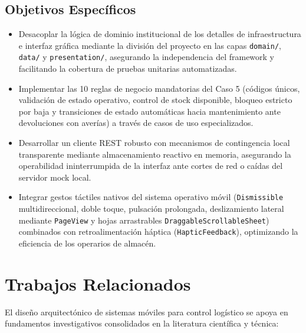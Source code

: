 \documentclass[12pt,a4paper]{article}
\begin{document}
\subsection{Objetivos Específicos}
\begin{itemize}
    \item Desacoplar la lógica de dominio institucional de los detalles de infraestructura e interfaz gráfica mediante la división del proyecto en las capas \texttt{domain/}, \texttt{data/} y \texttt{presentation/}, asegurando la independencia del framework y facilitando la cobertura de pruebas unitarias automatizadas.
    \item Implementar las 10 reglas de negocio mandatorias del Caso 5 (códigos únicos, validación de estado operativo, control de stock disponible, bloqueo estricto por baja y transiciones de estado automáticas hacia mantenimiento ante devoluciones con averías) a través de casos de uso especializados.
    \item Desarrollar un cliente REST robusto con mecanismos de contingencia local transparente mediante almacenamiento reactivo en memoria, asegurando la operabilidad ininterrumpida de la interfaz ante cortes de red o caídas del servidor mock local.
    \item Integrar gestos táctiles nativos del sistema operativo móvil (\texttt{Dismissible} multidireccional, doble toque, pulsación prolongada, deslizamiento lateral mediante \texttt{PageView} y hojas arrastrables \texttt{DraggableScrollableSheet}) combinados con retroalimentación háptica (\texttt{HapticFeedback}), optimizando la eficiencia de los operarios de almacén.
\end{itemize}

\section{Trabajos Relacionados}
El diseño arquitectónico de sistemas móviles para control logístico se apoya en fundamentos investigativos consolidados en la literatura científica y técnica:
\end{document}
